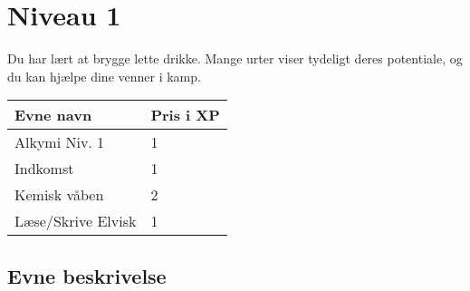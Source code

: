 \chapter{Niveau 1}
Du har lært at brygge lette drikke. Mange urter viser tydeligt deres potentiale, og du kan hjælpe dine venner i kamp.
\begin{table}[H]
    \centering
    \begin{tabular}{|p{}|p{}|}
    \rowcolor{cerulean!80}\hline
        Evne navn & Pris i XP \\\hline
         Alkymi Niv. 1 & 1 \\\hline
         Indkomst & 1 \\\hline
         Kemisk våben & 2 \\\hline
         Læse/Skrive Elvisk & 1\\
         \hline
    \end{tabular}
\end{table}

\section{Evne beskrivelse}








